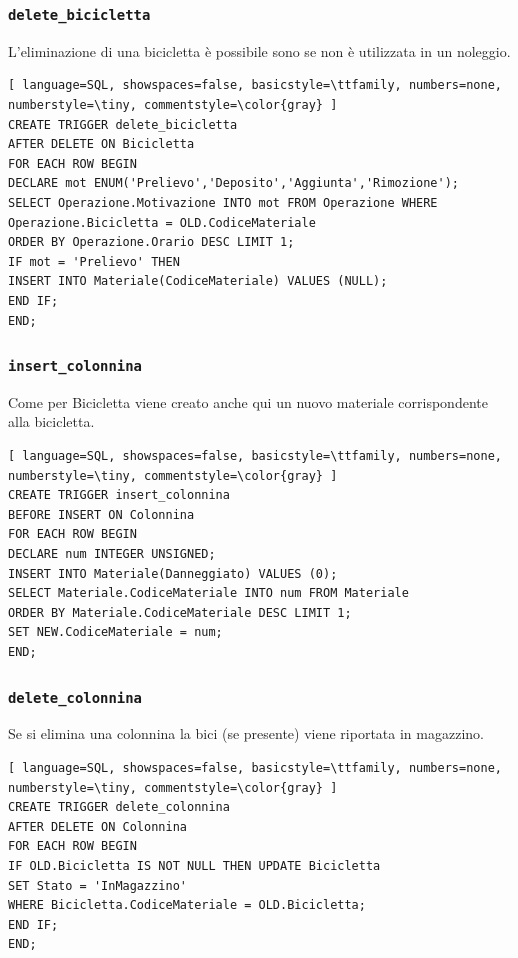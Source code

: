 \documentclass[a4paper,twoside]{article}
\begin{document}
\subsubsection{\texttt{delete\_bicicletta}}
L'eliminazione di una bicicletta è possibile sono se non è utilizzata in un noleggio.
\begin{lstlisting}[ language=SQL, showspaces=false, basicstyle=\ttfamily, numbers=none, numberstyle=\tiny, commentstyle=\color{gray} ]
CREATE TRIGGER delete_bicicletta
AFTER DELETE ON Bicicletta
FOR EACH ROW BEGIN
DECLARE mot ENUM('Prelievo','Deposito','Aggiunta','Rimozione');
SELECT Operazione.Motivazione INTO mot FROM Operazione WHERE
Operazione.Bicicletta = OLD.CodiceMateriale
ORDER BY Operazione.Orario DESC LIMIT 1;
IF mot = 'Prelievo' THEN
INSERT INTO Materiale(CodiceMateriale) VALUES (NULL);
END IF;
END;
\end{lstlisting}
\subsubsection{\texttt{insert\_colonnina}}
Come per Bicicletta viene creato anche qui un nuovo materiale corrispondente alla bicicletta.
\begin{lstlisting}[ language=SQL, showspaces=false, basicstyle=\ttfamily, numbers=none, numberstyle=\tiny, commentstyle=\color{gray} ]
CREATE TRIGGER insert_colonnina
BEFORE INSERT ON Colonnina
FOR EACH ROW BEGIN
DECLARE num INTEGER UNSIGNED;
INSERT INTO Materiale(Danneggiato) VALUES (0);
SELECT Materiale.CodiceMateriale INTO num FROM Materiale
ORDER BY Materiale.CodiceMateriale DESC LIMIT 1;
SET NEW.CodiceMateriale = num;
END;
\end{lstlisting}
\subsubsection{\texttt{delete\_colonnina}}
Se si elimina una colonnina la bici (se presente) viene riportata in magazzino.
\begin{lstlisting}[ language=SQL, showspaces=false, basicstyle=\ttfamily, numbers=none, numberstyle=\tiny, commentstyle=\color{gray} ]
CREATE TRIGGER delete_colonnina
AFTER DELETE ON Colonnina
FOR EACH ROW BEGIN
IF OLD.Bicicletta IS NOT NULL THEN UPDATE Bicicletta
SET Stato = 'InMagazzino'
WHERE Bicicletta.CodiceMateriale = OLD.Bicicletta;
END IF;
END;
\end{lstlisting}
\end{document}
